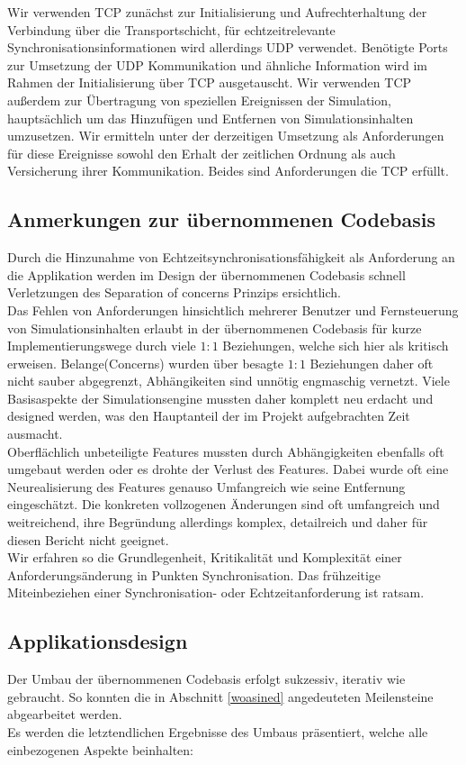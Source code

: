 \documentclass[11pt,twoside,a4paper]{article}
\begin{document}
Wir verwenden TCP zunächst zur Initialisierung und Aufrechterhaltung der Verbindung über die Transportschicht, für echtzeitrelevante Synchronisationsinformationen wird allerdings UDP verwendet. Benötigte Ports zur Umsetzung der UDP Kommunikation und ähnliche Information wird im Rahmen der Initialisierung über TCP ausgetauscht.
Wir verwenden TCP außerdem zur Übertragung von speziellen Ereignissen der Simulation, hauptsächlich um das Hinzufügen und Entfernen von Simulationsinhalten umzusetzen. Wir ermitteln unter der derzeitigen Umsetzung als Anforderungen für diese Ereignisse sowohl den Erhalt der zeitlichen Ordnung als auch Versicherung ihrer Kommunikation. Beides sind Anforderungen die TCP erfüllt.

\subsection{Anmerkungen zur übernommenen Codebasis}
Durch die Hinzunahme von Echtzeitsynchronisationsfähigkeit als Anforderung an die Applikation werden im Design der übernommenen Codebasis schnell Verletzungen des Separation of concerns Prinzips ersichtlich.\\
Das Fehlen von Anforderungen hinsichtlich mehrerer Benutzer und Fernsteuerung von Simulationsinhalten erlaubt in der übernommenen Codebasis für kurze Implementierungswege durch viele $1:1$ Beziehungen, welche sich hier als kritisch erweisen. Belange(Concerns) wurden über besagte $1:1$ Beziehungen daher oft nicht sauber abgegrenzt, Abhängikeiten sind unnötig engmaschig vernetzt. Viele Basisaspekte der Simulationsengine mussten daher komplett neu erdacht und designed werden, was den Hauptanteil der im Projekt aufgebrachten Zeit ausmacht.\\
Oberflächlich unbeteiligte Features mussten durch Abhängigkeiten ebenfalls oft umgebaut werden oder es drohte der Verlust des Features. Dabei wurde oft eine Neurealisierung des Features genauso Umfangreich wie seine Entfernung eingeschätzt.
Die konkreten vollzogenen Änderungen sind oft umfangreich und weitreichend, ihre Begründung allerdings komplex, detailreich und daher für diesen Bericht nicht geeignet.\\
Wir erfahren so die Grundlegenheit, Kritikalität und Komplexität einer Anforderungsänderung in Punkten Synchronisation.
Das frühzeitige Miteinbeziehen einer Synchronisation- oder Echtzeitanforderung ist ratsam.

\subsection{Applikationsdesign}
Der Umbau der übernommenen Codebasis erfolgt sukzessiv, iterativ wie gebraucht. So konnten die in
Abschnitt \ref{woasined}
angedeuteten Meilensteine abgearbeitet werden.\\
Es werden die letztendlichen Ergebnisse des Umbaus präsentiert, welche alle einbezogenen Aspekte beinhalten:
\end{document}
